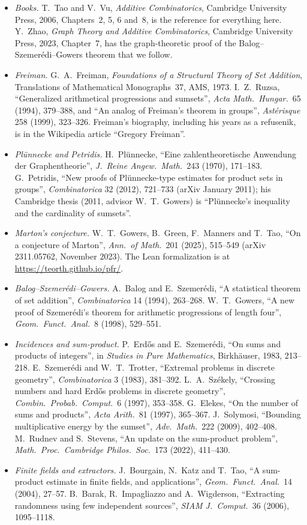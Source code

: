 \begin{itemize}
\item \emph{Books.} T.~Tao and V.~Vu, \emph{Additive Combinatorics}, Cambridge University Press, 2006, Chapters~2, 5, 6 and~8, is the reference for everything here. Y.~Zhao, \emph{Graph Theory and Additive Combinatorics}, Cambridge University Press, 2023, Chapter~7, has the graph-theoretic proof of the Balog--Szemerédi--Gowers theorem that we follow.
\item \emph{Freiman.} G.~A.~Freiman, \emph{Foundations of a Structural Theory of Set Addition}, Translations of Mathematical Monographs~37, AMS, 1973. I.~Z.~Ruzsa, ``Generalized arithmetical progressions and sumsets'', \emph{Acta Math.\ Hungar.}\ 65 (1994), 379--388, and ``An analog of Freiman's theorem in groups'', \emph{Astérisque} 258 (1999), 323--326. Freiman's biography, including his years as a refusenik, is in the Wikipedia article ``Gregory Freiman''.
\item \emph{Plünnecke and Petridis.} H.~Plünnecke, ``Eine zahlentheoretische Anwendung der Graphentheorie'', \emph{J.\ Reine Angew.\ Math.}\ 243 (1970), 171--183. G.~Petridis, ``New proofs of Plünnecke-type estimates for product sets in groups'', \emph{Combinatorica} 32 (2012), 721--733 (arXiv January 2011); his Cambridge thesis (2011, advisor W.~T.~Gowers) is ``Plünnecke's inequality and the cardinality of sumsets''.
\item \emph{Marton's conjecture.} W.~T.~Gowers, B.~Green, F.~Manners and T.~Tao, ``On a conjecture of Marton'', \emph{Ann.\ of Math.}\ 201 (2025), 515--549 (arXiv 2311.05762, November 2023). The Lean formalization is at \url{https://teorth.github.io/pfr/}.
\item \emph{Balog--Szemerédi--Gowers.} A.~Balog and E.~Szemerédi, ``A statistical theorem of set addition'', \emph{Combinatorica} 14 (1994), 263--268. W.~T.~Gowers, ``A new proof of Szemerédi's theorem for arithmetic progressions of length four'', \emph{Geom.\ Funct.\ Anal.}\ 8 (1998), 529--551.
\item \emph{Incidences and sum-product.} P.~Erdős and E.~Szemerédi, ``On sums and products of integers'', in \emph{Studies in Pure Mathematics}, Birkhäuser, 1983, 213--218. E.~Szemerédi and W.~T.~Trotter, ``Extremal problems in discrete geometry'', \emph{Combinatorica} 3 (1983), 381--392. L.~A.~Székely, ``Crossing numbers and hard Erdős problems in discrete geometry'', \emph{Combin.\ Probab.\ Comput.}\ 6 (1997), 353--358. G.~Elekes, ``On the number of sums and products'', \emph{Acta Arith.}\ 81 (1997), 365--367. J.~Solymosi, ``Bounding multiplicative energy by the sumset'', \emph{Adv.\ Math.}\ 222 (2009), 402--408. M.~Rudnev and S.~Stevens, ``An update on the sum-product problem'', \emph{Math.\ Proc.\ Cambridge Philos.\ Soc.}\ 173 (2022), 411--430.
\item \emph{Finite fields and extractors.} J.~Bourgain, N.~Katz and T.~Tao, ``A sum-product estimate in finite fields, and applications'', \emph{Geom.\ Funct.\ Anal.}\ 14 (2004), 27--57. B.~Barak, R.~Impagliazzo and A.~Wigderson, ``Extracting randomness using few independent sources'', \emph{SIAM J.\ Comput.}\ 36 (2006), 1095--1118.
\end{itemize}
